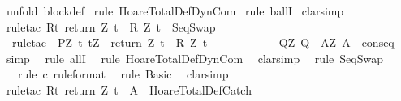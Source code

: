 \begin{isabellebody}
\ {\isacharparenleft}unfold\ block{\isacharunderscore}def{\isacharparenright}\isanewline
{}\isamarkupfalse%
\ {\isacharparenleft}rule\ HoareTotalDef{\isachardot}DynCom{\isacharparenright}\isanewline
{}\isamarkupfalse%
\ {\isacharparenleft}rule\ ballI{\isacharparenright}\isanewline
{}\isamarkupfalse%
\ clarsimp\isanewline
{}\isamarkupfalse%
\ {\isacharparenleft}rule{\isacharunderscore}tac\ R{\isacharequal}{\isachardoublequoteopen}{\isacharbraceleft}t{\isachardot}\ return\ Z\ t\ {\isasymin}\ R\ Z\ t{\isacharbraceright}{\isachardoublequoteclose}\ \ SeqSwap\ {\isacharparenright}\isanewline
{}\isamarkupfalse%
\ \ {\isacharparenleft}rule{\isacharunderscore}tac\ \ P{\isacharprime}{\isacharequal}{\isachardoublequoteopen}{\isasymlambda}Z{\isacharprime}{\isachardot}\ {\isacharbraceleft}t{\isachardot}\ t{\isacharequal}Z{\isacharprime}\ {\isasymand}\ return\ Z\ t\ {\isasymin}\ R\ Z\ t{\isacharbraceright}{\isachardoublequoteclose}\ \ \isanewline
\ \ \ \ \ \ \ \ \ \ Q{\isacharprime}{\isacharequal}{\isachardoublequoteopen}{\isasymlambda}Z{\isacharprime}{\isachardot}\ Q{\isachardoublequoteclose}\ \ A{\isacharprime}{\isacharequal}{\isachardoublequoteopen}{\isasymlambda}Z{\isacharprime}{\isachardot}\ A{\isachardoublequoteclose}\ \ conseq{\isacharparenright}\isanewline
{}\isamarkupfalse%
\ {}\ \isamarkupfalse%
\ simp\isanewline
{}\isamarkupfalse%
\ \ {\isacharparenleft}rule\ allI{\isacharparenright}\isanewline
{}\isamarkupfalse%
\ \ {\isacharparenleft}rule\ HoareTotalDef{\isachardot}DynCom{\isacharparenright}\isanewline
{}\isamarkupfalse%
\ \ {\isacharparenleft}clarsimp{\isacharparenright}\isanewline
{}\isamarkupfalse%
\ \ {\isacharparenleft}rule\ SeqSwap{\isacharparenright}\isanewline
{}\isamarkupfalse%
\ \ \ {\isacharparenleft}rule\ c\ {\isacharbrackleft}rule{\isacharunderscore}format{\isacharbrackright}{\isacharparenright}\isanewline
{}\isamarkupfalse%
\ \ {\isacharparenleft}rule\ Basic{\isacharparenright}\isanewline
{}\isamarkupfalse%
\ \ clarsimp\isanewline
{}\isamarkupfalse%
\ {\isacharparenleft}rule{\isacharunderscore}tac\ R{\isacharequal}{\isachardoublequoteopen}{\isacharbraceleft}t{\isachardot}\ return\ Z\ t\ {\isasymin}\ A{\isacharbraceright}{\isachardoublequoteclose}\ \ HoareTotalDef{\isachardot}Catch{\isacharparenright}\isanewline
{}\isamarkupfalse%

\end{isabellebody}
